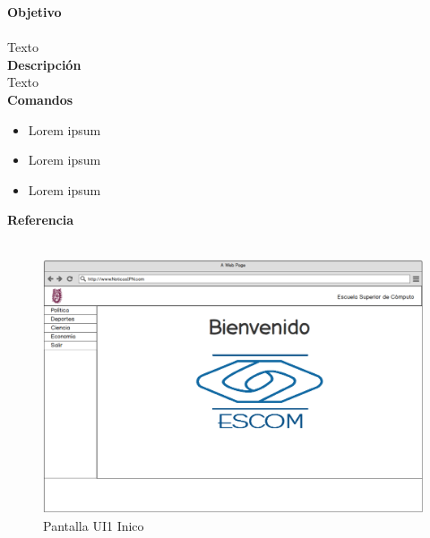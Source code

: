 
\Large{\textbf{Objetivo}}\\\\
\normalsize{Texto}\\

	

\Large{\textbf{Descripción}}\\
\normalsize{Texto}\\

\Large{\textbf{Comandos}}\\
\normalsize{}

\begin{itemize}
	\item Lorem ipsum
	\item Lorem ipsum
	\item Lorem ipsum
\end{itemize}


\Large{\textbf{Referencia}}\\\\
\normalsize{}

\begin{figure}[h]
  \centering
	\includegraphics[scale=.35]{imagenes/Pantallas/UI1}
  \caption{Pantalla UI1 Inico}
  \label{fig:UI1}
\end{figure}



